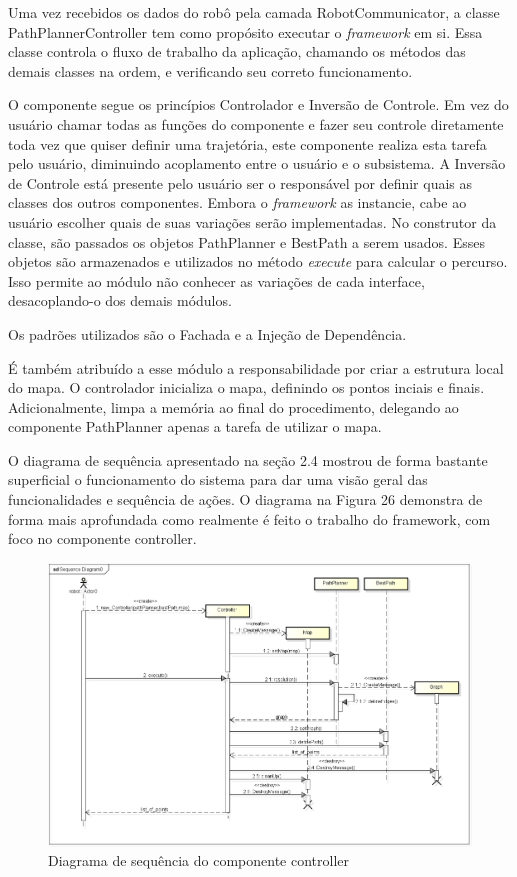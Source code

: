Uma vez recebidos os dados do robô pela camada RobotCommunicator, a classe PathPlannerController tem como propósito executar o \textit{framework} em si. Essa classe controla o fluxo de trabalho da aplicação, chamando os métodos das demais classes na ordem, e verificando seu correto funcionamento.

O componente segue os princípios Controlador e Inversão de Controle. Em vez do usuário chamar todas as funções do componente e fazer seu controle diretamente toda vez que quiser definir uma trajetória, este componente realiza esta tarefa pelo usuário, diminuindo acoplamento entre o usuário e o subsistema. A Inversão de Controle está presente pelo usuário ser o responsável por definir quais as classes dos outros componentes. Embora o \textit{framework} as instancie, cabe ao usuário escolher quais de suas variações serão implementadas. No construtor da classe, são passados os objetos PathPlanner e BestPath a serem usados. Esses objetos são armazenados e utilizados no método \textit{execute} para calcular o percurso. Isso permite ao módulo não conhecer as variações de cada interface, desacoplando-o dos demais módulos.

Os padrões utilizados são o Fachada e a Injeção de Dependência.

É também atribuído a esse módulo a responsabilidade por criar a estrutura local do mapa. O controlador inicializa o mapa, definindo os pontos inciais e finais. Adicionalmente, limpa a memória ao final do procedimento, delegando ao componente PathPlanner apenas a tarefa de utilizar o mapa.

O diagrama de sequência apresentado na seção 2.4 mostrou de forma bastante superficial o funcionamento do sistema para dar uma visão geral das funcionalidades e sequência de ações. O diagrama na Figura 26 demonstra de forma mais aprofundada como realmente é feito o trabalho do framework, com foco no componente controller.

\begin{figure}[h]
	\centering
	\label{fig26}
		\includegraphics[keepaspectratio=true,scale=0.4]{figuras/executeController.png}
	\caption{Diagrama de sequência do componente controller}
\end{figure}

